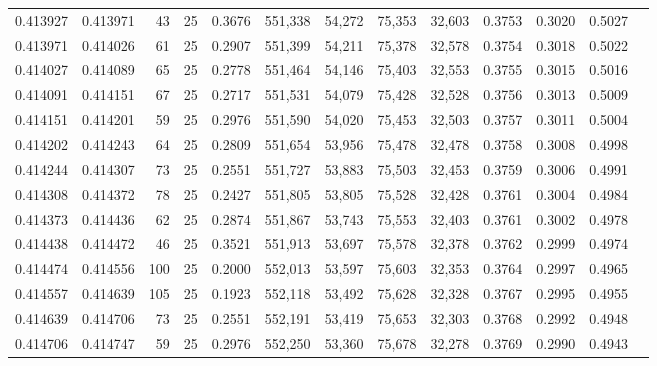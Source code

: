 \begin{tabular}{rrrrrrrrrrrrr}
0.413927 & 0.413971 &    43 &  25 &                                     0.3676 & 551,338 &  54,272 &  75,353 &  32,603 & 0.3753 & 0.3020 & 0.5027 \\
0.413971 & 0.414026 &    61 &  25 &                                     0.2907 & 551,399 &  54,211 &  75,378 &  32,578 & 0.3754 & 0.3018 & 0.5022 \\
0.414027 & 0.414089 &    65 &  25 &                                     0.2778 & 551,464 &  54,146 &  75,403 &  32,553 & 0.3755 & 0.3015 & 0.5016 \\
0.414091 & 0.414151 &    67 &  25 &                                     0.2717 & 551,531 &  54,079 &  75,428 &  32,528 & 0.3756 & 0.3013 & 0.5009 \\
0.414151 & 0.414201 &    59 &  25 &                                     0.2976 & 551,590 &  54,020 &  75,453 &  32,503 & 0.3757 & 0.3011 & 0.5004 \\
0.414202 & 0.414243 &    64 &  25 &                                     0.2809 & 551,654 &  53,956 &  75,478 &  32,478 & 0.3758 & 0.3008 & 0.4998 \\
0.414244 & 0.414307 &    73 &  25 &                                     0.2551 & 551,727 &  53,883 &  75,503 &  32,453 & 0.3759 & 0.3006 & 0.4991 \\
0.414308 & 0.414372 &    78 &  25 &                                     0.2427 & 551,805 &  53,805 &  75,528 &  32,428 & 0.3761 & 0.3004 & 0.4984 \\
0.414373 & 0.414436 &    62 &  25 &                                     0.2874 & 551,867 &  53,743 &  75,553 &  32,403 & 0.3761 & 0.3002 & 0.4978 \\
0.414438 & 0.414472 &    46 &  25 &                                     0.3521 & 551,913 &  53,697 &  75,578 &  32,378 & 0.3762 & 0.2999 & 0.4974 \\
0.414474 & 0.414556 &   100 &  25 &                                     0.2000 & 552,013 &  53,597 &  75,603 &  32,353 & 0.3764 & 0.2997 & 0.4965 \\
0.414557 & 0.414639 &   105 &  25 &                                     0.1923 & 552,118 &  53,492 &  75,628 &  32,328 & 0.3767 & 0.2995 & 0.4955 \\
0.414639 & 0.414706 &    73 &  25 &                                     0.2551 & 552,191 &  53,419 &  75,653 &  32,303 & 0.3768 & 0.2992 & 0.4948 \\
0.414706 & 0.414747 &    59 &  25 &                                     0.2976 & 552,250 &  53,360 &  75,678 &  32,278 & 0.3769 & 0.2990 & 0.4943 \\

\end{tabular}
